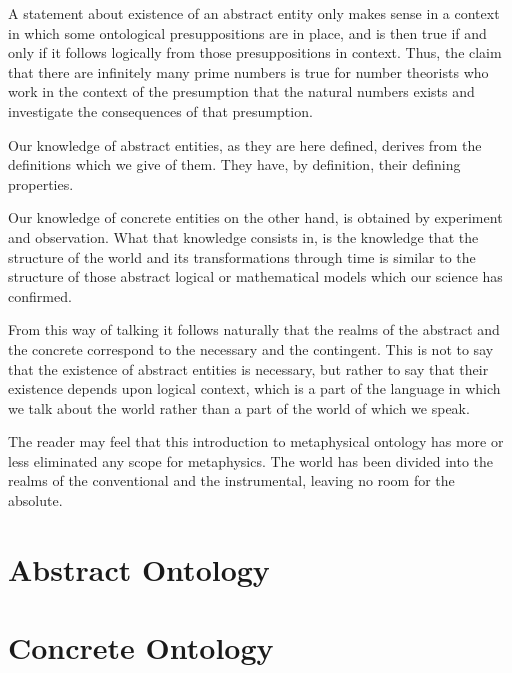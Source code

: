 \documentclass{rbjk}
\begin{document}
\begin{article}
A statement about existence of an abstract entity only makes sense in a context in which some ontological presuppositions are in place, and is then true if and only if it follows logically from those presuppositions in context.
Thus, the claim that there are infinitely many prime numbers is true for number theorists who work in the context of the presumption that the natural numbers exists and investigate the consequences of that presumption.

Our knowledge of abstract entities, as they are here defined, derives from the definitions which we give of them.
They have, by definition, their defining properties.

Our knowledge of concrete entities on the other hand, is obtained by experiment and observation.
What that knowledge consists in, is the knowledge that the structure of the world and its transformations through time is similar to the structure of those abstract logical or mathematical models which our science has confirmed.

From this way of talking it follows naturally that the realms of the abstract and the concrete correspond to the necessary and the contingent.
This is not to say that the existence of abstract entities is necessary, but rather to say that their existence depends upon logical context, which is a part of the language in which we talk about the world rather than a part of the world of which we speak.

The reader may feel that this introduction to metaphysical ontology has more or less eliminated any scope for metaphysics.
The world has been divided into the realms of the conventional and the instrumental, leaving no room for the absolute.



\section{Abstract Ontology}

\section{Concrete Ontology}

%
%

\end{article}
\end{document}
